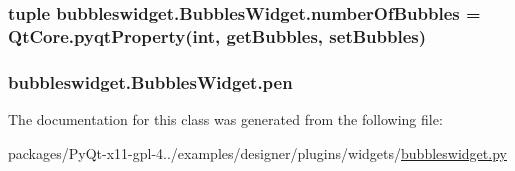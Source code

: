 \subsubsection[{number\+Of\+Bubbles}]{\setlength{\rightskip}{0pt plus 5cm}tuple bubbleswidget.\+Bubbles\+Widget.\+number\+Of\+Bubbles = Qt\+Core.\+pyqt\+Property(int, {\bf get\+Bubbles}, {\bf set\+Bubbles})\hspace{0.3cm}{\ttfamily [static]}}\label{classbubbleswidget_1_1BubblesWidget_aee55ee7a16570d2877c0a9ae6164a938}
\hypertarget{classbubbleswidget_1_1BubblesWidget_a1561b2b304c8d1b439c2f721f91fde9b}{}
\subsubsection[{pen}]{\setlength{\rightskip}{0pt plus 5cm}bubbleswidget.\+Bubbles\+Widget.\+pen}\label{classbubbleswidget_1_1BubblesWidget_a1561b2b304c8d1b439c2f721f91fde9b}


The documentation for this class was generated from the following file\+:\begin{DoxyCompactItemize}
\item 
packages/\+Py\+Qt-\/x11-\/gpl-\/4../examples/designer/plugins/widgets/\hyperlink{bubbleswidget_8py}{bubbleswidget.\+py}\end{DoxyCompactItemize}
